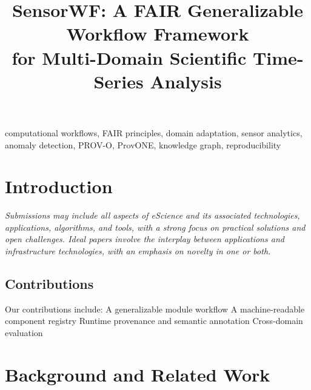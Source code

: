 \documentclass[conference]{IEEEtran}
\begin{document}
\title{SensorWF: A FAIR Generalizable Workflow Framework\\for Multi-Domain Scientific Time-Series Analysis}

\author{
}

\maketitle

\begin{abstract}

\end{abstract}

\begin{IEEEkeywords}
computational workflows, FAIR principles, domain adaptation, sensor analytics,
anomaly detection, PROV-O, ProvONE, knowledge graph, reproducibility
\end{IEEEkeywords}

\section{Introduction}

\textit{Submissions may include all aspects of eScience and its associated technologies, applications, algorithms, and tools, with a strong focus on practical solutions and open challenges. Ideal papers involve the interplay between applications and infrastructure technologies, with an emphasis on novelty in one or both.}

\subsection{Contributions}
Our contributions include:
A generalizable module workflow
A machine-readable component registry
Runtime provenance and semantic annotation
Cross-domain evaluation

\section{Background and Related Work}
\label{sec:background}
\end{document}
